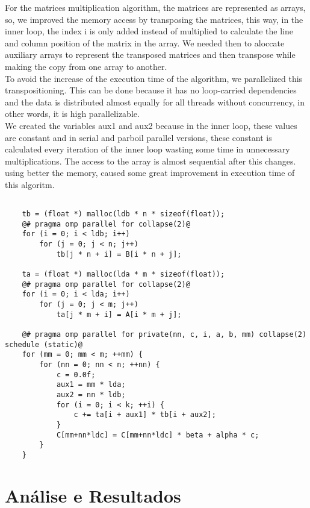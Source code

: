 \documentclass[10pt,a4paper]{report}
\begin{document}
For the matrices multiplication algorithm, the matrices are represented as arrays, so, we improved the memory access by transposing the matrices, this way, in the inner loop, the index i is only added instead of multiplied to calculate the line and column position of the matrix in the array. We needed then to aloccate auxiliary arrays to represent the transposed matrices and then transpose while making the copy from one array to another. \\

To avoid the increase of the execution time of the algorithm, we parallelized this transpositioning. This can be done because it has no loop-carried dependencies and the data is distributed almost equally for all threads without concurrency, in other words, it is high parallelizable. \\

We created the variables aux1 and aux2 because in the inner loop, these values are constant and in serial and parboil parallel versions, these constant is calculated every iteration of the inner loop wasting some time in unnecessary multiplications. The access to the array is almost sequential after this changes. using better the memory, caused some great improvement in execution time of this algoritm.\\

\begin{lstlisting}[caption=Our parallel source code for sgemm,style=base]

	tb = (float *) malloc(ldb * n * sizeof(float));
	@# pragma omp parallel for collapse(2)@
	for (i = 0; i < ldb; i++)
		for (j = 0; j < n; j++)
			tb[j * n + i] = B[i * n + j];

	ta = (float *) malloc(lda * m * sizeof(float));
	@# pragma omp parallel for collapse(2)@
	for (i = 0; i < lda; i++)
		for (j = 0; j < m; j++)
			ta[j * m + i] = A[i * m + j];

	@# pragma omp parallel for private(nn, c, i, a, b, mm) collapse(2) schedule (static)@
	for (mm = 0; mm < m; ++mm) {
		for (nn = 0; nn < n; ++nn) {
			c = 0.0f;
			aux1 = mm * lda;
			aux2 = nn * ldb;
			for (i = 0; i < k; ++i) {
				c += ta[i + aux1] * tb[i + aux2];
			}
			C[mm+nn*ldc] = C[mm+nn*ldc] * beta + alpha * c;
		}
	}
\end{lstlisting}

\newpage
\chapter{Análise e Resultados}
\end{document}
